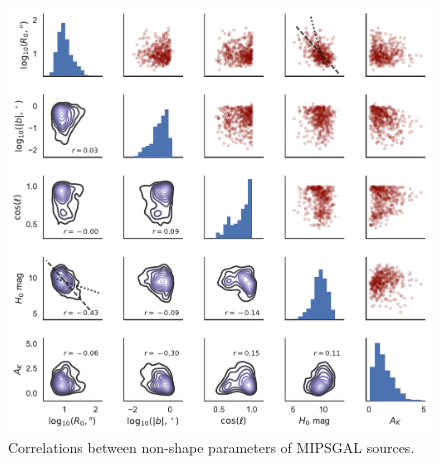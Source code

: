 \begin{figure}
  \centering
  \includegraphics[width=\textwidth]{figs/mipsgal-pairplot}
  \caption[]{Correlations between non-shape parameters of MIPSGAL sources.}
  \label{fig:mipsgal-pairplot}
\end{figure}

